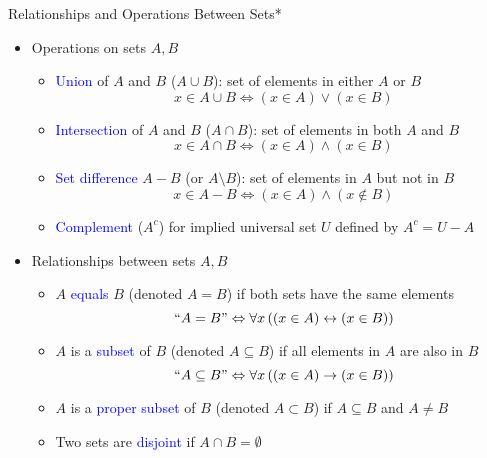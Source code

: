 \documentclass[10pt,english]{beamer}
\begin{document}
\begin{frame}{Relationships and Operations Between Sets*}

\begin{itemize}
\setlength\itemsep{3mm}
\item<1-> Operations on sets $A,B$ \vspace{1mm}
\begin{itemize} 
  \setlength\itemsep{1.5mm}
  \item \textcolor{blue}{Union} of $A$ and $B$ ($A\cup B$): set of elements in either $A$ or $B$
\[ x\in A\cup B \Leftrightarrow (x\in A)\vee (x\in B) \]
  \item \textcolor{blue}{Intersection} of $A$ and $B$ ($A\cap B$): set of elements in both $A$ and $B$
\[ x\in A\cap B \Leftrightarrow (x\in A)\wedge (x\in B) \]
  \item \textcolor{blue}{Set difference} $A-B$ (or $A \setminus \!B$): set of elements in $A$ but not in $B$
\[ x\in A-B \Leftrightarrow (x\in A)\wedge (x\notin B) \]
  \item \textcolor{blue}{Complement} ($A^c$) for implied universal set $U$  defined by $A^c = U-A$
\end{itemize}

\item<2-> Relationships between sets $A,B$ \vspace{1mm}
\begin{itemize} 
  \setlength\itemsep{1.5mm}
  \item $A$ \textcolor{blue}{equals} $B$ (denoted $A=B$) if both sets have the same elements
\[ ``A=B" \Leftrightarrow \forall x \left( (x\in A)\leftrightarrow (x\in B) \right) \]
  \item $A$ is a \textcolor{blue}{subset} of $B$ (denoted $A\subseteq B$) if all elements in $A$ are also in $B$
\[ ``A\subseteq B"  \Leftrightarrow \forall x \left( (x\in A)\rightarrow (x\in B) \right) \]
  \item $A$ is a \textcolor{blue}{proper subset} of $B$ (denoted $A\subset B$) if $A\subseteq B$ and $A\neq B$
  \item Two sets are \textcolor{blue}{disjoint} if $A\cap B = \emptyset$
\end{itemize}

\end{itemize}
\end{frame}
\end{document}
